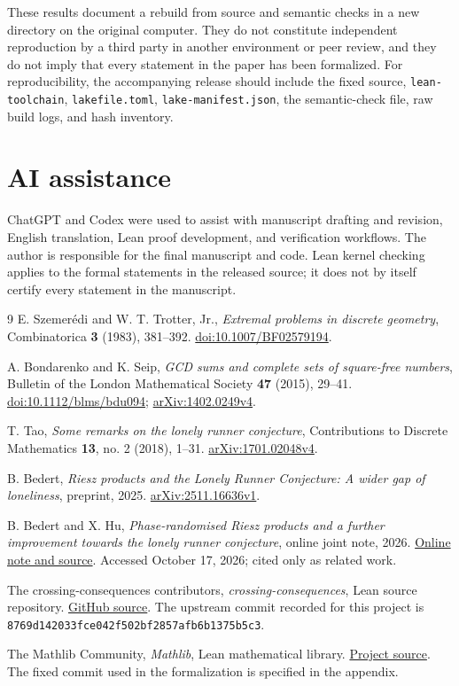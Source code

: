 \documentclass[12pt,leqno]{article}
\numberwithin{equation}{section}
\theoremstyle{remark}
\begin{document}
These results document a rebuild from source and semantic checks in a new directory on the original computer.
They do not constitute independent reproduction by a third party in another environment or peer review,
and they do not imply that every statement in the paper has been formalized.
For reproducibility, the accompanying release should include the fixed source, \texttt{lean-toolchain},
\texttt{lakefile.toml}, \texttt{lake-manifest.json}, 
the semantic-check file, raw build logs, and hash inventory.

\clearpage
\section*{AI assistance}
ChatGPT and Codex were used to assist with manuscript drafting
and revision, English translation, Lean proof development, and
verification workflows. The author is responsible for the final
manuscript and code. Lean kernel checking applies to the formal
statements in the released source; it does not by itself certify
every statement in the manuscript.

\begin{thebibliography}{9}
E. Szemer\'edi and W. T. Trotter, Jr.,
\emph{Extremal problems in discrete geometry},
Combinatorica \textbf{3} (1983), 381--392.
\href{https://doi.org/10.1007/BF02579194}{doi:10.1007/BF02579194}.

A. Bondarenko and K. Seip,
\emph{GCD sums and complete sets of square-free numbers},
Bulletin of the London Mathematical Society \textbf{47} (2015), 29--41.
\href{https://doi.org/10.1112/blms/bdu094}{doi:10.1112/blms/bdu094};
\href{https://arxiv.org/abs/1402.0249v4}{arXiv:1402.0249v4}.

T. Tao, \emph{Some remarks on the lonely runner conjecture},
Contributions to Discrete Mathematics \textbf{13}, no. 2 (2018), 1--31.
\href{https://arxiv.org/abs/1701.02048v4}{arXiv:1701.02048v4}.

B. Bedert, \emph{Riesz products and the Lonely Runner Conjecture:
A wider gap of loneliness}, preprint, 2025.
\href{https://arxiv.org/abs/2511.16636v1}{arXiv:2511.16636v1}.

B. Bedert and X. Hu, \emph{Phase-randomised Riesz products and a further
improvement towards the lonely runner conjecture}, online joint note, 2026.
\href{https://github.com/hxypqr/phase_riesz_products_lonely_runner}{Online note and source}.
Accessed October 17, 2026; cited only as related work.

The crossing-consequences contributors, \emph{crossing-consequences}, Lean source repository.
\href{https://github.com/wpegden/crossing-consequences}{GitHub source}.
The upstream commit recorded for this project is\newline
\texttt{8769d142033fce042f502bf2857afb6b1375b5c3}.

The Mathlib Community, \emph{Mathlib}, Lean mathematical library.
\href{https://github.com/leanprover-community/mathlib4}{Project source}.
The fixed commit used in the formalization is specified in the appendix.
\end{thebibliography}
\end{document}
